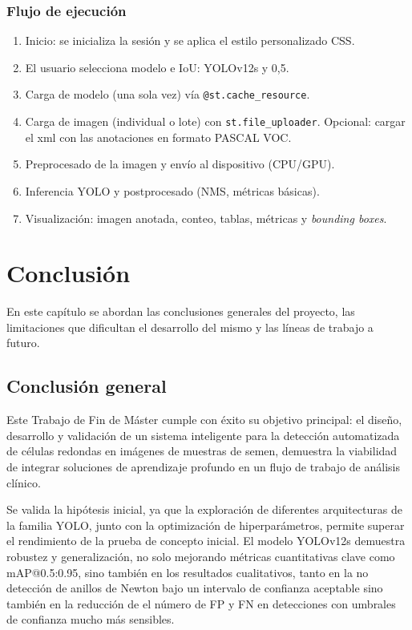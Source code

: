 \documentclass[12pt,a4paper,onecolumn,oneside]{report}
\begin{document}
\subsection{Flujo de ejecución}
\begin{enumerate}
  \item Inicio: se inicializa la sesión y se aplica el estilo personalizado CSS.
  \item El usuario selecciona modelo e IoU: YOLOv12s y 0,5.
  \item Carga de modelo (una sola vez) vía \texttt{@st.cache\_resource}.
  \item Carga de imagen (individual o lote) con \texttt{st.file\_uploader}. Opcional: cargar el xml con las anotaciones en formato PASCAL VOC.
  \item Preprocesado de la imagen y envío al dispositivo (CPU/GPU).
  \item Inferencia YOLO y postprocesado (NMS, métricas básicas).
  \item Visualización: imagen anotada, conteo, tablas, métricas y \textit{bounding boxes}.
\end{enumerate}


\chapter{Conclusión} %

En este capítulo se abordan las conclusiones generales del proyecto, las limitaciones que dificultan el desarrollo del mismo y las líneas de trabajo a futuro.

\section{Conclusión general}
\label{sec:Conclusión general}

Este Trabajo de Fin de Máster cumple con éxito su objetivo principal: el diseño, desarrollo y validación de un sistema inteligente para la detección automatizada de células redondas en imágenes de muestras de semen, demuestra
la viabilidad de integrar soluciones de aprendizaje profundo en un flujo de trabajo de análisis clínico.

Se valida la hipótesis inicial, ya que la exploración de diferentes arquitecturas de la familia YOLO, junto con la optimización de hiperparámetros, permite superar el rendimiento de la prueba de concepto inicial. 
El modelo YOLOv12s demuestra robustez y generalización, no solo mejorando métricas cuantitativas clave como mAP@0.5:0.95, sino también en los resultados cualitativos, tanto en la no detección de anillos de Newton bajo un intervalo de confianza aceptable sino también
en la reducción de el número de FP y FN en detecciones con umbrales de confianza mucho más sensibles.  
\end{document}
